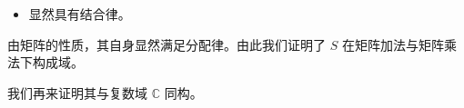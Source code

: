 \begin{question}
\begin{solution}
\begin{itemize}
  \[
  \begin{pmatrix}a&b\\-b&a\end{pmatrix}
  \begin{pmatrix}c&d\\-d&c\end{pmatrix}
  =\begin{pmatrix}ac-bd&bc+ad\\-bc-ad&ac-bd\end{pmatrix},
  \]
  \[
  \begin{pmatrix}c&d\\-d&c\end{pmatrix}
  \begin{pmatrix}a&b\\-b&a\end{pmatrix}
  =\begin{pmatrix}ac-bd&bc+ad\\-bc-ad&ac-bd\end{pmatrix};
  \]
  \item 显然具有结合律。
\end{itemize}

由矩阵的性质，其自身显然满足分配律。由此我们证明了 \(S\) 在矩阵加法与矩阵乘法下构成域。

我们再来证明其与复数域 \(\mathbb{C}\) 同构。


\end{solution}
\end{question}
